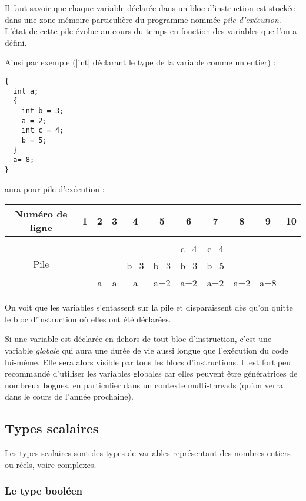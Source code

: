 Il faut savoir que chaque variable déclarée dans un bloc d'instruction est stockée dans une zone mémoire particulière du programme nommée \textsl{pile d'exécution}. L'état de cette pile évolue au cours du temps en fonction des variables que l'on a défini.

Ainsi par exemple (|int| déclarant le type de la variable comme un entier) :

\begin{lstlisting}[stepnumber=1,caption=Exemple de pile d'exécution]
{
  int a;
  {
    int b = 3;
    a = 2;
    int c = 4;
    b = 5;
  }
  a= 8;
}
\end{lstlisting}

aura pour pile d'exécution :

\begin{tabular}{|c||c|c|c|c|c|c|c|c|c|c|}\hline
Numéro de ligne & 1 & 2 & 3 & 4 & 5 & 6 & 7 & 8 & 9 & 10 \\ \hline\hline
\multirow{4}{*}{Pile} & & & & & & & & & & \\
\cline{2-11} &   &   &   &   &   &c=4&c=4&   &   &    \\
\cline{2-11} &   &   &   &b=3&b=3&b=3&b=5&   &   &    \\
\cline{2-11} &   & a & a & a &a=2&a=2&a=2&a=2&a=8&    \\ \hline
\end{tabular}

On voit que les variables s'entassent sur la pile et disparaissent dès qu'on quitte le bloc d'instruction où elles ont été déclarées. 

Si une variable est déclarée en dehors de tout bloc d'instruction, c'est une variable \textsl{globale} qui aura une durée de vie aussi longue que l'exécution du code lui-même. Elle sera alors visible par tous les blocs d'instructions. Il est fort peu recommandé d'utiliser les variables globales car elles peuvent être génératrices de nombreux bogues, en particulier dans un contexte multi-threads (qu'on verra dans le cours de l'année prochaine).

\subsection{Types scalaires}

Les types scalaires sont des types de variables représentant des nombres entiers ou réels, voire complexes. 

\subsubsection{Le type booléen}

